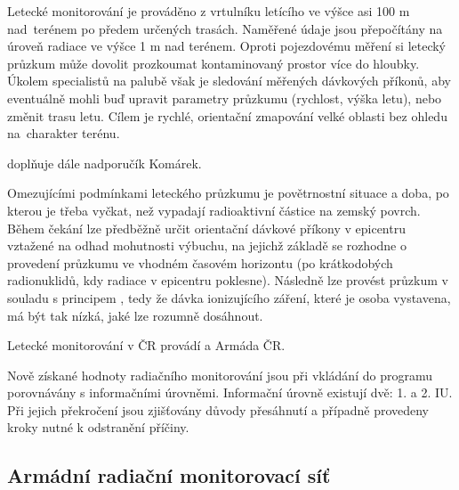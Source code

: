 \begin{itemize}
  Letecké monitorování je prováděno z vrtulníku letícího ve výšce asi
  100 m nad~teré\-nem po předem určených trasách. Naměřené údaje jsou
  přepočítány na úroveň radiace ve výšce 1 m nad terénem. Oproti
  pojezdovému měření si letecký průzkum může dovolit prozkoumat
  kontaminovaný prostor více do hloubky. Úkolem specialistů na palubě
  však je sledování měřených dávkových příkonů, aby eventuálně mohli
  buď upravit parametry průzkumu (rychlost, výška letu), nebo změnit
  trasu letu. Cílem je rychlé, orientační zmapování velké oblasti bez
  ohledu na~charakter terénu.
	
   doplňuje dále nadporučík
  Komárek.
	
  Omezujícími podmínkami leteckého průzkumu je povětrnostní situace a
  doba, po kterou je třeba vyčkat, než vypadají radioaktivní částice
  na zemský povrch. Během čekání lze předběžně určit orientační
  dávkové příkony v epicentru vztažené na odhad mohutnosti výbuchu, na
  jejichž základě se rozhodne o provedení průzkumu ve vhodném časovém
  horizontu (po  krátkodobých radionuklidů, kdy radiace v
  epicentru poklesne). Následně lze provést průzkum v souladu s
  principem , tedy že dávka ionizujícího záření, které je
  osoba vystavena, má být tak nízká, jaké lze rozumně dosáhnout.
	
  Letecké monitorování v ČR provádí  a Armáda ČR.

\end{itemize}
	
Nově získané hodnoty radiačního monitorování jsou při vkládání do
programu  porovnávány s informačními úrovněmi. Informační
úrovně existují dvě: 1. a 2. IU. Při jejich překročení jsou zjišťovány
důvody přesáhnutí a případně provedeny kroky nutné k odstranění
příčiny.
	
\subsection{Armádní radiační monitorovací síť}	
	
	
